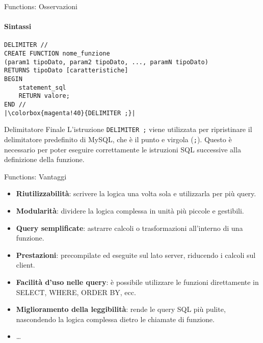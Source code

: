 \begin{frame}[fragile]{Functions: Osservazioni}
\framesubtitle{Sintassi}
\vspace{-.8cm}
\begin{lstlisting}
DELIMITER //
CREATE FUNCTION nome_funzione
(param1 tipoDato, param2 tipoDato, ..., paramN tipoDato)
RETURNS tipoDato [caratteristiche]
BEGIN
    statement_sql
    RETURN valore;
END //
|\colorbox{magenta!40}{DELIMITER ;}|
\end{lstlisting}

\vspace{-.4cm}

\begin{minipage}{\textwidth}
    \begin{block}{Delimitatore Finale}
    L'istruzione \texttt{DELIMITER ;} viene utilizzata per ripristinare il delimitatore predefinito di MySQL, che \`e il punto e virgola (\texttt{;}).
    Questo \`e necessario per poter eseguire correttamente le istruzioni SQL successive alla definizione della funzione.
    \end{block}
    \end{minipage}
\end{frame}
%
\begin{frame}{Functions: Vantaggi}
    \begin{itemize}[<+->]
        \item \textbf{Riutilizzabilit\`a}: scrivere la logica una volta sola e utilizzarla per pi\`u query.
        \item \textbf{Modularit\`a}: dividere la logica complessa in unit\`a pi\`u piccole e gestibili.
	    \item \textbf{Query semplificate}: astrarre calcoli o trasformazioni all'interno di una funzione.
	    \item \textbf{Prestazioni}: precompilate ed eseguite sul lato server, riducendo i calcoli sul client.
	    \item \textbf{Facilit\`a d'uso nelle query}: \`e possibile utilizzare le funzioni direttamente in SELECT, WHERE, ORDER BY, ecc.
	    \item \textbf{Miglioramento della leggibilit\`a}: rende le query SQL pi\`u pulite, nascondendo la logica complessa dietro le chiamate di funzione.
	    \item \ldots
    \end{itemize}
\end{frame}
%
